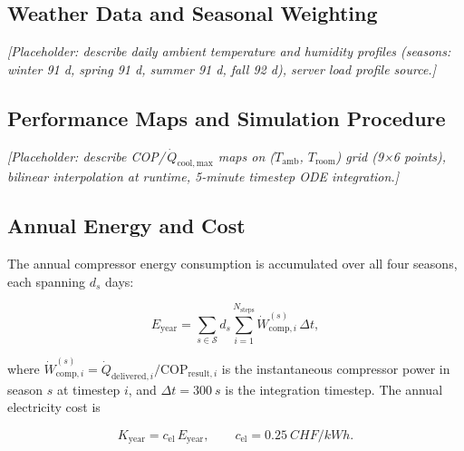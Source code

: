 \documentclass[12pt, a4paper]{article}
\newcommand{\Qdot}{\dot{Q}}
\newcommand{\Wdot}{\dot{W}}
\newcommand{\Tamb}{T_{\mathrm{amb}}}
\newcommand{\Troom}{T_{\mathrm{room}}}
\begin{document}
\subsection{Weather Data and Seasonal Weighting}
\label{sec:weather}

\textit{[Placeholder: describe daily ambient temperature and humidity profiles (seasons:
winter 91 d, spring 91 d, summer 91 d, fall 92 d), server load profile source.]}

\subsection{Performance Maps and Simulation Procedure}
\label{sec:maps}

\textit{[Placeholder: describe COP/\,$\Qdot_{\mathrm{cool,max}}$ maps on
($\Tamb$, $\Troom$) grid (9×6 points), bilinear interpolation at runtime,
5-minute timestep ODE integration.]}

\subsection{Annual Energy and Cost}
\label{sec:energy}

The annual compressor energy consumption is accumulated over all four seasons,
each spanning $d_s$ days:

\begin{equation}
  E_{\mathrm{year}}
  = \sum_{s \in \mathcal{S}} d_s
    \sum_{i=1}^{N_{\mathrm{steps}}}
    \Wdot_{\mathrm{comp},i}^{(s)}\,\Delta t,
  \label{eq:Eyear}
\end{equation}

where $\Wdot_{\mathrm{comp},i}^{(s)} = \Qdot_{\mathrm{delivered},i}/\mathrm{COP}_{\mathrm{result},i}$
is the instantaneous compressor power in season $s$ at timestep $i$, and
$\Delta t = \SI{300}{s}$ is the integration timestep.
The annual electricity cost is

\begin{equation}
  K_{\mathrm{year}} = c_{\mathrm{el}}\,E_{\mathrm{year}},
  \qquad c_{\mathrm{el}} = \SI{0.25}{CHF/kWh}.
  \label{eq:Kyear}
\end{equation}

\end{document}
